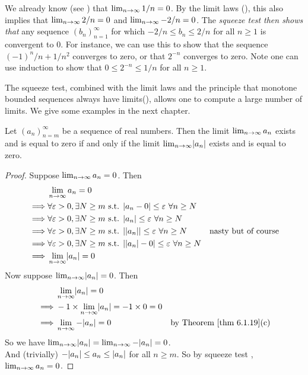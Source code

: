 \begin{example} \label{example 6.4.15}
We already know (see ) that \(\lim_{n \to \infty} 1/n = 0\).
By the limit laws (), this also implies that \(\lim_{n \to \infty} 2/n = 0\) and \(\lim_{n \to \infty} -2/n = 0\). 
The \emph{squeeze test then shows that} any sequence \((b_n)_{n = 1}^{\infty}\) for which \(-2/n \le b_n \le 2/n\) for all \(n \ge 1\) is convergent to \(0\).
For instance, we can use this to show that the sequence \((-1)^n/n + 1/n^2\) converges to zero,
or that \(2^{-n}\) converges to zero.
Note one can use induction to show that \(0 \le 2^{-n} \le 1/n\) for all \(n \ge 1\).
\end{example}

\begin{remark} \label{remark 6.4.16}
The squeeze test, combined with the limit laws and the principle that monotone bounded sequences always have limits(),
allows one to compute a large number of limits.
We give some examples in the next chapter.
\end{remark}

\begin{corollary}  \label{corollary 6.4.17}
Let \((a_n)_{n = m}^{\infty}\) be a sequence
of real numbers.
Then the limit \(\lim_{n \to \infty} a_n\) exists and is equal to zero if and only if the limit \(\lim_{n \to \infty} \lvert a_n\rvert\) exists and is equal to zero.
\end{corollary}

\begin{proof}
Suppose \(\lim_{n \to \infty} a_n = 0\). Then
\begin{align*}
             & \lim_{n \to \infty} a_n = 0 \\
    \implies & \forall \varepsilon > 0, \exists N \ge m \text{ s.t. } \lvert a_n - 0\rvert \le \varepsilon\ \forall n \ge N \\
    \implies & \forall \varepsilon > 0, \exists N \ge m \text{ s.t. } \lvert a_n\rvert \le \varepsilon\ \forall n \ge N \\
    \implies & \forall \varepsilon > 0, \exists N \ge m \text{ s.t. } \lvert\lvert a_n\rvert\rvert \le \varepsilon\ \forall n \ge N & \text{nasty but of course} \\
    \implies & \forall \varepsilon > 0, \exists N \ge m \text{ s.t. } \lvert\lvert a_n\rvert - 0\rvert \le \varepsilon\ \forall n \ge N \\
    \implies & \lim_{n \to \infty} \lvert a_n\rvert = 0
\end{align*}
Now suppose \(\lim_{n \to \infty} \lvert a_n\rvert = 0\). Then
\begin{align*}
             & \lim_{n \toINF} \abs{a_n} = 0 \\
    \implies & -1 \X \lim_{n \toINF} \abs{a_n} = -1 \X 0 = 0 \\
    \implies & \lim_{n \toINF} -\abs{a_n} = 0 & \text{by \THM{6.1.19}(c)}
\end{align*}
So we have \(\lim_{n \to \infty} \lvert a_n\rvert = \lim_{n \to \infty} -\lvert a_n\rvert = 0\). \\
And (trivially) \(-\lvert a_n\rvert \le a_n \le \lvert a_n\rvert\) for all \(n \ge m\).
So by squeeze test , \(\lim_{n \to \infty} a_n = 0\).
\end{proof}


